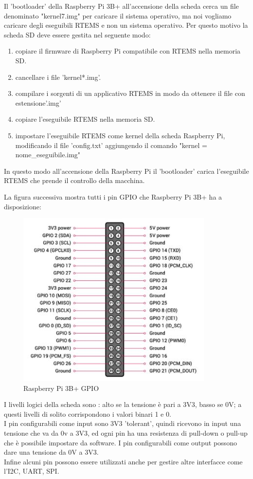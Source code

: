 \documentclass[12pt, a4paper, titlepage, oneside]{book}
\begin{document}
\begin{flushleft}
Il 'bootloader' della Raspberry Pi 3B+ all'accensione della scheda cerca un file denominato "kernel7.img" per caricare il sistema operativo, ma noi vogliamo caricare degli eseguibili RTEMS e non un sistema operativo.
Per questo motivo la scheda SD deve essere gestita nel seguente modo:
\begin{enumerate}
    \item copiare il firmware di Raspberry Pi compatibile con RTEMS nella memoria SD.
    \item cancellare i file 'kernel*.img'. 
    \item compilare i sorgenti di un applicativo RTEMS in modo da ottenere il file con estensione'.img' 
    \item copiare l'eseguibile RTEMS nella memoria SD.
    \item impostare l'eseguibile RTEMS come kernel della scheda Raspberry Pi, modificando il file 'config.txt' aggiungendo il comando "kernel = nome\_eseguibile.img"
\end{enumerate}

In questo modo all'accensione della Raspberry Pi il 'bootloader' carica l'eseguibile RTEMS che prende il controllo della macchina.

\newpage
La figura successiva mostra tutti i pin GPIO che Raspberry Pi 3B+ ha a disposizione:
\begin{figure}[h]
    \centering
    \includegraphics[scale = 1.50]{RPi3B_GPIO.JPG}
    \caption{Raspberry Pi 3B+ GPIO}
    \label{fig:RPi3B_GPIO}
\end{figure}

I livelli logici della scheda sono : alto se la tensione è pari a 3V3, basso se 0V; a questi livelli di solito corrispondono i valori binari 1 e 0.\\
I pin configurabili come input sono 3V3 'tolerant', quindi ricevono in input una tensione che va da 0v a 3V3, ed ogni pin ha una resistenza di pull-down o pull-up che è possibile impostare da software.
I pin configurabili come output possono dare una tensione da 0V a 3V3.\\
Infine alcuni pin possono essere utilizzati anche per gestire altre interfacce come l'I2C, UART, SPI.
\newpage

\end{flushleft}
\end{document}
